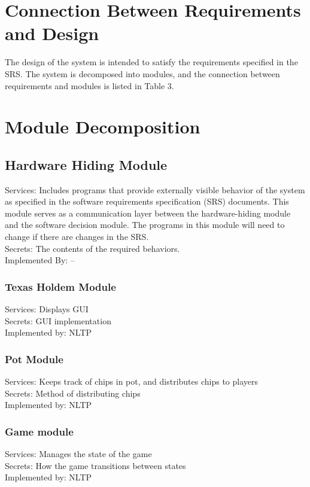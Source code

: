 \documentclass[11pt]{article}
\begin{document}
	\section{Connection Between Requirements and Design}
    The design of the system is intended to satisfy the requirements specified in the SRS. The system is decomposed into modules, and the connection between requirements and modules is listed in Table 3.
	\section{Module Decomposition}    
    \subsection{Hardware Hiding Module}
    Services: Includes programs that provide externally visible behavior of the system as specified in the software requirements specification (SRS) documents. This module serves as a communication layer between the hardware-hiding module and the software decision module. The programs in this module will need to change if there are changes in the SRS. \\
    Secrets: The contents of the required behaviors. \\
    Implemented By: –\\
    \subsubsection{Texas Holdem Module}
    Services: Displays GUI\\

    Secrets: GUI implementation\\

    Implemented by: NLTP\\

    \subsubsection{Pot Module}
    Services: Keeps track of chips in pot, and distributes chips to players\\

    Secrets: Method of distributing chips\\ 

    Implemented by: NLTP\\

    \subsubsection{Game module}
    Services: Manages the state of the game\\
    Secrets: How the game transitions between states \\
    Implemented by: NLTP\\
\end{document}
